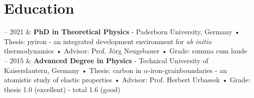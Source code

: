 \documentclass[11pt, a4paper]{article}
\newcommand{\TUKL}{Technical University of Kaiserslautern}
\newcommand{\Duration}[2]{\fontsize{10pt}{0}\selectfont #1 -- #2}
\begin{document}
\section{Education}

\begin{EntriesTable}
  \Duration{2015}{2021}  &
  \textbf{PhD in Theoretical Physics} - Paderborn University, Germany \newline
   • Thesis: pyiron - an integrated development environment for \textit{ab initio} thermodynamics \newline
   • Advisor: Prof. J\"org Neugebauer\newline
   • Grade: summa cum laude
  \\
  \Duration{2009}{2015}  &
  \textbf{Advanced Degree in Physics} - \TUKL, Germany \newline
   • Thesis: carbon in $\alpha$-iron-grainboundaries - an atomistic study of elastic properties\newline
   • Advisor: Prof. Herbert Urbassek\newline
   • Grade: thesis 1.0 (excellent) - total 1.6 (good)
\end{EntriesTable}
\pagebreak
\end{document}
